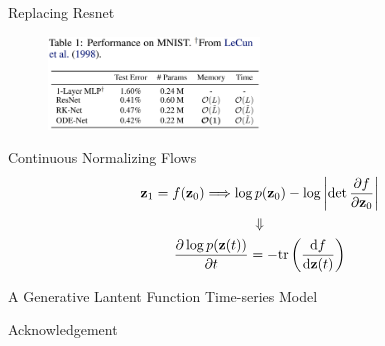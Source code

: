 \documentclass[12pt,aspectratio=169]{beamer}
\begin{document}
\begin{frame}{Replacing Resnet}
  \begin{figure}
    \begin{center}
      \includegraphics[width=0.5\textwidth]{figures/ODEnet.png}
    \end{center}
  \end{figure}
\end{frame}

\begin{frame}{Continuous Normalizing Flows}
  \begin{gather*}
    \textbf{\textrm{z}}_1 = f(\textbf{\textrm{z}}_0) \Longrightarrow \log p(\textbf{\textrm{z}}_0) 
    - \log \left|\det \frac{\partial f}{\partial \textbf{\textrm{z}}_0}\right| \\
    \Downarrow \\
    \frac{\partial\log p(\textbf{\textrm{z}}(t))}{\partial t}=-\textrm{tr}\left(\frac{\textrm{d}f}
    {\textrm{d}\textbf{\textrm{z}}(t)}\right)
  \end{gather*}
\end{frame}

\begin{frame}{A Generative Lantent Function Time-series Model}
  
\end{frame}

\begin{frame}{Acknowledgement}
  \begin{center}
    \textcolor{gray}{\Huge{\centerline{}}}
  \end{center}
\end{frame}
\end{document}
